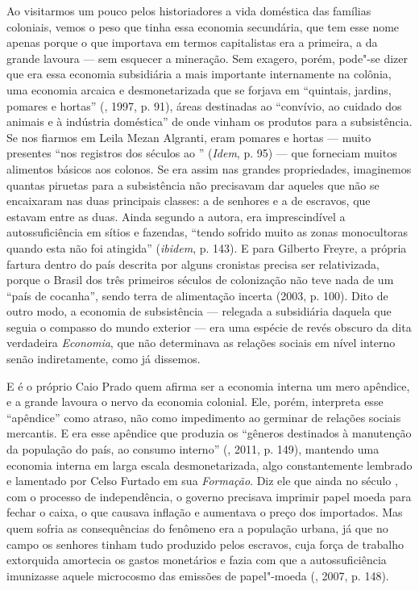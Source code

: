 Ao visitarmos um pouco pelos historiadores a vida doméstica das famílias
coloniais, vemos o peso que tinha essa economia secundária, que tem esse
nome apenas porque o que importava em termos capitalistas era a
primeira, a da grande lavoura --- sem esquecer a mineração. Sem exagero,
porém, pode"-se dizer que era essa economia subsidiária a mais importante
internamente na colônia, uma economia arcaica e desmonetarizada que se
forjava em ``quintais, jardins, pomares e hortas'' (, 1997, p.
91), áreas destinadas ao ``convívio, ao cuidado dos animais e à indústria
doméstica'' de onde vinham os produtos para a subsistência. Se nos
fiarmos em Leila Mezan Algranti, eram pomares e hortas --- muito
presentes ``nos registros dos séculos  ao '' (\emph{Idem}, p. 95)
--- que forneciam muitos alimentos básicos aos colonos. Se era assim nas
grandes propriedades, imaginemos quantas piruetas para a subsistência
não precisavam dar aqueles que não se encaixaram nas duas principais
classes: a de senhores e a de escravos, que estavam entre as duas. Ainda
segundo a autora, era imprescindível a autossuficiência em sítios e
fazendas, ``tendo sofrido muito as zonas monocultoras quando esta não
foi atingida'' (\emph{ibidem}, p. 143). E para Gilberto Freyre, a
própria fartura dentro do país descrita por alguns cronistas precisa ser
relativizada, porque o Brasil dos três primeiros séculos de colonização
não teve nada de um ``país de cocanha'', sendo terra de alimentação
incerta (2003, p. 100). Dito de outro modo, a economia de subsistência
--- relegada a subsidiária daquela que seguia o compasso do mundo
exterior --- era uma espécie de revés obscuro da dita verdadeira
\emph{Economia}, que não determinava as relações sociais em nível
interno senão indiretamente, como já dissemos.

E é o próprio Caio Prado quem afirma ser a economia interna um mero
apêndice, e a grande lavoura o nervo da economia colonial. Ele, porém,
interpreta esse ``apêndice'' como atraso, não como impedimento ao
germinar de relações sociais mercantis. E era esse apêndice que produzia
os ``gêneros destinados à manutenção da população do país, ao consumo
interno'' (, 2011, p. 149), mantendo uma economia
interna em larga escala desmonetarizada, algo constantemente lembrado e
lamentado por Celso Furtado em sua \emph{Formação}. Diz ele que ainda no
século , com o processo de independência, o governo precisava
imprimir papel moeda para fechar o caixa, o que causava inflação e
aumentava o preço dos importados. Mas quem sofria as consequências do
fenômeno era a população urbana, já que no campo os senhores tinham tudo
produzido pelos escravos, cuja força de trabalho extorquida amortecia os
gastos monetários e fazia com que a autossuficiência imunizasse aquele
microcosmo das emissões de papel"-moeda (, 2007, p. 148).

